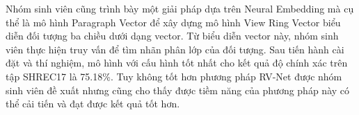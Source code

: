 \begin{EnAbstract}
Nhóm sinh viên cũng trình bày một giải pháp dựa trên Neural Embedding mà cụ thể là mô hình Paragraph Vector để xây dựng mô hình View Ring Vector biểu diễn đối tượng ba chiều dưới dạng vector. Từ biểu diễn vector này, nhóm sinh viên thực hiện truy vấn để tìm nhãn phân lớp của đối tượng. Sau tiến hành cài đặt và thí nghiệm, mô hình với cấu hình tốt nhất cho kết quả độ chính xác trên tập SHREC17 là 75.18\%. Tuy không tốt hơn phương pháp RV-Net được nhóm sinh viên đề xuất nhưng cũng cho thấy được tiềm năng của phương pháp này có thể cải tiến và đạt được kết quả tốt hơn. 


\end{EnAbstract}